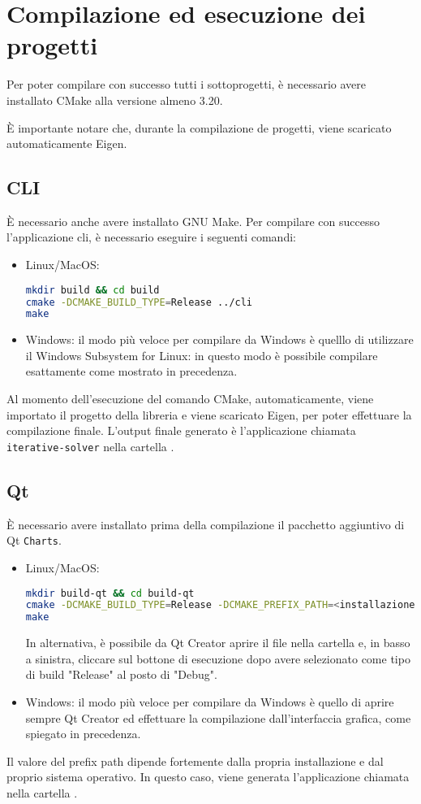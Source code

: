 	\appendix
\section{Compilazione ed esecuzione dei progetti}
Per poter compilare con successo tutti i sottoprogetti, è necessario avere installato CMake alla versione almeno 3.20.

È importante notare che, durante la compilazione de progetti, viene scaricato automaticamente Eigen.

\subsection{CLI}
È necessario anche avere installato GNU Make\cite{Make}.
Per compilare con successo l'applicazione cli, è necessario eseguire i seguenti comandi:
\begin{itemize}
	\item Linux/MacOS: 
	\begin{lstlisting}[language=Bash]
mkdir build && cd build
cmake -DCMAKE_BUILD_TYPE=Release ../cli
make \end{lstlisting}

\item Windows: il modo più veloce per compilare da Windows è quelllo di utilizzare il Windows Subsystem for Linux: in questo modo è possibile compilare esattamente come mostrato in precedenza.
\end{itemize} 


Al momento dell'esecuzione del comando CMake, automaticamente, viene importato il progetto della libreria e viene scaricato Eigen, per poter effettuare la compilazione finale. L'output finale generato è l'applicazione chiamata \texttt{iterative-solver} nella cartella .

\subsection{Qt}
È necessario avere installato prima della compilazione il pacchetto aggiuntivo di Qt \texttt{Charts}.
\begin{itemize}
	\item Linux/MacOS: 
	\begin{lstlisting}[language=Bash]
mkdir build-qt && cd build-qt
cmake -DCMAKE_BUILD_TYPE=Release -DCMAKE_PREFIX_PATH=<installazione di Qt>/<versione>/<sistema> ../QTInterface
make \end{lstlisting}
In alternativa, è possibile da Qt Creator aprire il file  nella cartella  e, in basso a sinistra, cliccare sul bottone di esecuzione dopo avere selezionato come tipo di build "Release" al posto di "Debug".

\item Windows: il modo più veloce per compilare da Windows è quello di aprire sempre Qt Creator ed effettuare la compilazione dall'interfaccia grafica, come spiegato in precedenza.
\end{itemize}
Il valore del prefix path dipende fortemente dalla propria installazione e dal proprio sistema operativo. In questo caso, viene generata l'applicazione chiamata  nella cartella .